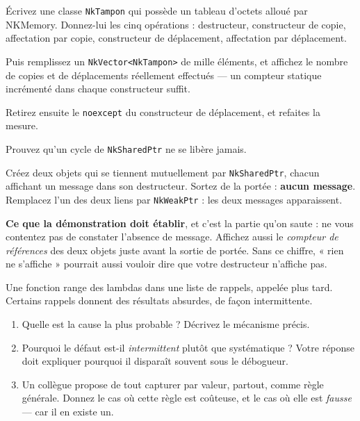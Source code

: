 \begin{nkpratique}
Écrivez une classe \texttt{NkTampon} qui possède un tableau d'octets alloué par
NKMemory. Donnez-lui les cinq opérations : destructeur, constructeur de copie,
affectation par copie, constructeur de déplacement, affectation par déplacement.

Puis remplissez un \texttt{NkVector<NkTampon>} de mille éléments, et affichez le
nombre de copies et de déplacements réellement effectués --- un compteur statique
incrémenté dans chaque constructeur suffit.

Retirez ensuite le \texttt{noexcept} du constructeur de déplacement, et refaites
la mesure.
\end{nkpratique}

\begin{nkdemo}
Prouvez qu'un cycle de \texttt{NkSharedPtr} ne se libère jamais.

Créez deux objets qui se tiennent mutuellement par \texttt{NkSharedPtr}, chacun
affichant un message dans son destructeur. Sortez de la portée : \textbf{aucun
message}. Remplacez l'un des deux liens par \texttt{NkWeakPtr} : les deux
messages apparaissent.

\textbf{Ce que la démonstration doit établir}, et c'est la partie qu'on saute :
ne vous contentez pas de constater l'absence de message. Affichez aussi le
\emph{compteur de références} des deux objets juste avant la sortie de portée.
Sans ce chiffre, « rien ne s'affiche » pourrait aussi vouloir dire que votre
destructeur n'affiche pas.
\end{nkdemo}

\begin{nklogique}
Une fonction range des lambdas dans une liste de rappels, appelée plus tard.
Certains rappels donnent des résultats absurdes, de façon intermittente.

\begin{enumerate}
\item Quelle est la cause la plus probable ? Décrivez le mécanisme précis.
\item Pourquoi le défaut est-il \emph{intermittent} plutôt que systématique ?
      Votre réponse doit expliquer pourquoi il disparaît souvent sous le
      débogueur.
\item Un collègue propose de tout capturer par valeur, partout, comme règle
      générale. Donnez le cas où cette règle est coûteuse, et le cas où elle est
      \emph{fausse} --- car il en existe un.
\end{enumerate}
\end{nklogique}
